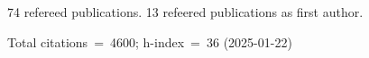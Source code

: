 74 refereed publications. 13 refeered publications as first author.

Total citations~=~4600; h-index~=~36 (2025-01-22)
